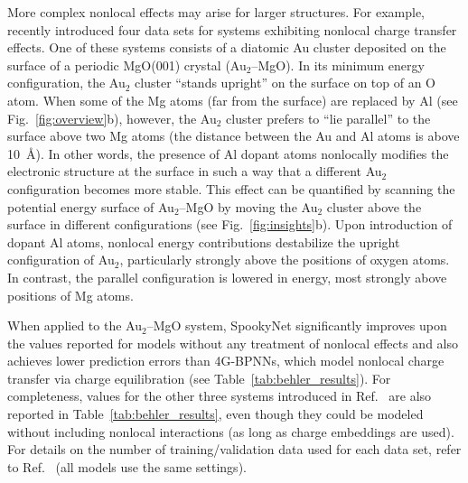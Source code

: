 \documentclass[%
superscriptaddress,
reprint,
nofootinbib,
amsmath,amssymb,amsfonts,
floatfix,
altaffilletter,
showkeys,
]{revtex4-2}
\newcommand{\nn}{SpookyNet}
\begin{document}
More complex nonlocal effects may arise for larger structures. For example, \citeauthor{ko2021fourth} recently introduced four data sets for systems exhibiting nonlocal charge transfer effects.\cite{ko2021fourth}
One of these systems
consists of a diatomic Au cluster deposited on the surface of a periodic MgO(001) crystal (Au$_2$\nobreakdash--MgO). In its minimum energy configuration, the Au$_2$ cluster ``stands upright'' on the surface on top of an O atom. When some of the Mg atoms (far from the surface) are replaced by Al (see Fig.~\ref{fig:overview}b), however, the Au$_2$ cluster prefers to ``lie parallel'' to the surface above two Mg atoms (the distance between the Au and Al atoms is above 10~\AA). In other words, the presence of Al dopant atoms nonlocally modifies the electronic structure at the surface in such a way that a different Au$_2$ configuration becomes more stable. This effect can be quantified by scanning the potential energy surface of Au$_2$\nobreakdash--MgO by moving the Au$_2$ cluster above the surface in different configurations (see Fig.~\ref{fig:insights}b). Upon introduction of dopant Al atoms, nonlocal energy contributions destabilize the upright configuration of Au$_2$, particularly strongly above the positions of oxygen atoms. In contrast, the parallel configuration is lowered in energy, most strongly above positions of Mg atoms.

When applied to the Au$_2$\nobreakdash--MgO system, \nn{} significantly improves upon the values reported for models without any treatment of nonlocal effects and also achieves lower prediction errors than 4G\nobreakdash-BPNNs,\cite{ko2021fourth} which model nonlocal charge transfer via charge equilibration (see Table~\ref{tab:behler_results}).
For completeness, values for the other three systems introduced in Ref.~ are also reported in Table~\ref{tab:behler_results}, even though they could be modeled without including nonlocal interactions (as long as charge embeddings are used). For details on the number of training/validation data used for each data set, refer to Ref.~ (all models use the same settings).
\end{document}
